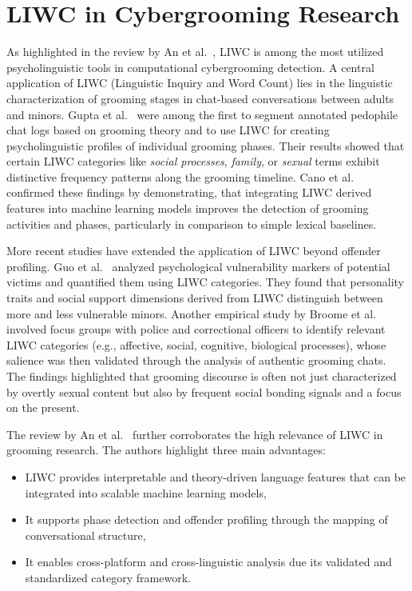 
\section{LIWC in Cybergrooming Research}
 As highlighted in the review by An et al.~\cite{an2025cybergrooming}, LIWC is among the most utilized psycholinguistic tools in computational cybergrooming detection. 
 A central application of LIWC (Linguistic Inquiry and Word Count) lies in the linguistic characterization of grooming stages in chat-based conversations between adults and minors. Gupta et al.~\cite{gupta2012characterizingpedophileconversationsinternet} were among the first to segment annotated pedophile chat logs based on grooming theory and to use LIWC for creating psycholinguistic profiles of individual grooming phases. Their results showed that certain LIWC categories like \textit{social processes}, \textit{family}, or \textit{sexual} terms exhibit distinctive frequency patterns along the grooming timeline. Cano et al.~\cite{Cano2014} confirmed these findings by demonstrating, that integrating LIWC derived features into machine learning models improves the detection of grooming activities and phases, particularly in comparison to simple lexical baselines. %

More recent studies have extended the application of LIWC beyond offender profiling. Guo et al.~\cite{guo2023text} analyzed psychological vulnerability markers of potential victims and quantified them using LIWC categories. %
 They found that personality traits and social support dimensions derived from LIWC distinguish between more and less vulnerable minors.  %
 Another empirical study by Broome et al.~\cite{broome2020psycholinguistic} involved focus groups with police and correctional officers to identify relevant LIWC categories (e.g., affective, social, cognitive, biological processes), whose salience was then validated through the analysis of authentic grooming chats. The findings highlighted that grooming discourse is often not just characterized by overtly sexual content but also by frequent social bonding signals and a focus on the present. %

The review by An et al.~\cite{an2025cybergrooming} further corroborates the high relevance of LIWC in grooming research. The authors highlight three main advantages:
\begin{itemize}
    \item LIWC provides interpretable and theory-driven language features that can be integrated into scalable machine learning models,
    \item It supports phase detection and offender profiling through the mapping of conversational structure,
    \item It enables cross-platform and cross-linguistic analysis due its validated and standardized category framework.
\end{itemize} %

